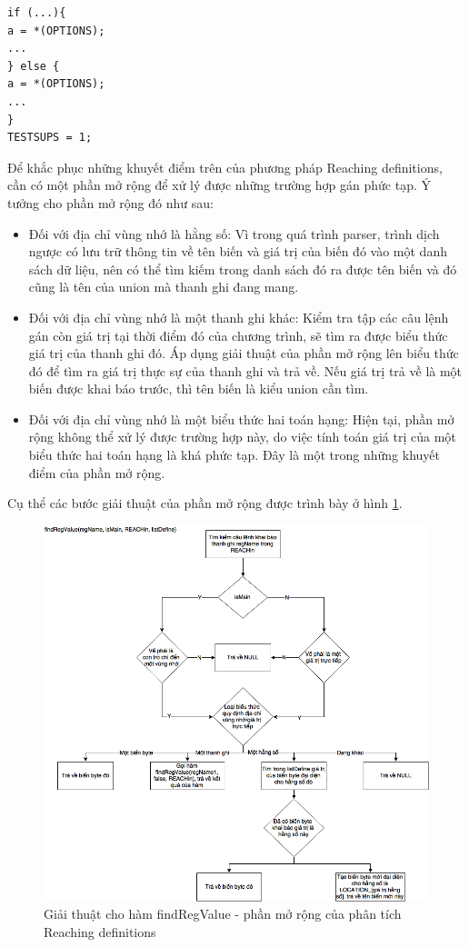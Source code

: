 \begin{lstlisting}[caption={Đoạn mã có nhiều câu lệnh khai báo cho ACC đến được một điểm của chương trình nhưng tất cả đều cùng giá trị},label={list:ifcond}]
if (...){
a = *(OPTIONS);
...
} else {
a = *(OPTIONS);
...
}
TESTSUPS = 1;
\end{lstlisting}
Để khắc phục những khuyết điểm trên của phương pháp Reaching definitions, cần có một phần mở rộng để xử lý được những trường hợp gán phức tạp. Ý tưởng cho phần mở rộng đó như sau:
\begin{itemize}
	\item Đối với địa chỉ vùng nhớ là hằng số: Vì trong quá trình parser, trình dịch ngược có lưu trữ thông tin về tên biến và giá trị của biến đó vào một danh sách dữ liệu, nên có thể tìm kiếm trong danh sách đó ra được tên biến và đó cũng là tên của union mà thanh ghi đang mang.
	\item Đối với địa chỉ vùng nhớ là một thanh ghi khác: Kiểm tra tập các câu lệnh gán còn giá trị tại thời điểm đó của chương trình, sẽ tìm ra được biểu thức giá trị của thanh ghi đó. Áp dụng giải thuật của phần mở rộng lên biểu thức đó để tìm ra giá trị thực sự của thanh ghi và trả về. Nếu giá trị trả về là một biến được khai báo trước, thì tên biến là kiểu union cần tìm.
	\item Đối với địa chỉ vùng nhớ là một biểu thức hai toán hạng: Hiện tại, phần mở rộng không thể xử lý được trường hợp này, do việc tính toán giá trị của một biểu thức hai toán hạng là khá phức tạp. Đây là một trong những khuyết điểm của phần mở rộng.
\end{itemize}
Cụ thể các bước giải thuật của phần mở rộng được trình bày ở hình \ref{fig:reachdefextendalgo}.
\begin{figure}
	\centering
	\includegraphics[width=\linewidth]{image/reachdefextendalgo}
	\caption{Giải thuật cho hàm findRegValue - phần mở rộng của phân tích Reaching definitions}
	\label{fig:reachdefextendalgo}
\end{figure}

